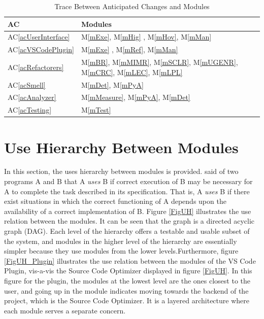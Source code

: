 \documentclass[12pt, titlepage]{article}
\newcommand{\acref}[1]{AC\ref{#1}}
\newcommand{\mref}[1]{M\ref{#1}}
\begin{document}
\begin{table}[H]
  \centering
  \begin{tabular}{p{} p{}}
  \toprule
  \textbf{AC} & \textbf{Modules}\\
  \midrule
  \acref{acUserInterface} & \mref{mExe}, \mref{mHig} , \mref{mHov}, \mref{mMan} \\
  \acref{acVSCodePlugin} & \mref{mExe} , \mref{mRef}, \mref{mMan} \\
  \acref{acRefactorers} & \mref{mBR}, \mref{mMIMR}, \mref{mSCLR}, \mref{mUGENR}, \mref{mCRC}, \mref{mLEC}, \mref{mLPL} \\
  \acref{acSmell} & \mref{mDet}, \mref{mPyA} \\
  \acref{acAnalyzer} & \mref{mMeasure}, \mref{mPyA}, \mref{mDet} \\
  \acref{acTesting} & \mref{mTest}  \\ 
  \bottomrule
  \end{tabular}
  \caption{Trace Between Anticipated Changes and Modules}
  \label{TblACT}
\end{table}

\section{Use Hierarchy Between Modules} \label{SecUse}

In this section, the uses hierarchy between modules is
provided. \citet{Parnas1978} said of two programs A and B that A {\em uses} B if
correct execution of B may be necessary for A to complete the task described in
its specification. That is, A {\em uses} B if there exist situations in which
the correct functioning of A depends upon the availability of a correct
implementation of B.  Figure \ref{FigUH} illustrates the use relation between
the modules. It can be seen that the graph is a directed acyclic graph
(DAG). Each level of the hierarchy offers a testable and usable subset of the
system, and modules in the higher level of the hierarchy are essentially simpler
because they use modules from the lower levels.Furthermore, figure \ref{FigUH_Plugin} 
illustrates the use relation between the modules of the VS Code Plugin, vis-a-vis the Source Code 
Optimizer displayed in  figure \ref{FigUH}. In this figure for the plugin, the modules at the lowest 
level are the ones closest to the user, and going up in the module indicates moving towards
the backend of the project, which is the Source Code Optimizer. It is a layered architecture
where each module serves a separate concern.
\end{document}
